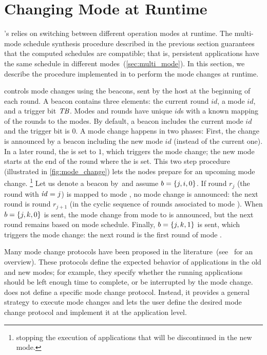 
\section{Changing Mode at Runtime}
\label{sec:modeChanges}

\TTW's  relies on switching between different operation modes at runtime. The multi-mode schedule synthesis procedure described in the previous section guarantees that the computed schedules are compatible; that is, persistent applications have the same schedule in different modes~(\cref{sec:multi_mode}).
In this section, we describe the procedure implemented in \TTW to perform the mode changes at runtime.

\TTW controls mode changes using the beacons, sent by the host at the beginning of each round. A beacon contains three elements: the current round $id$, a mode $id$, and a trigger bit $\mathit{TB}$.
Modes and rounds have unique $id$s with a known mapping of the rounds to the modes. By default, a beacon includes the current mode $id$ and the trigger bit is $0$.
%
A mode change happens in two phases:
First, the change is announced by a beacon including the new mode $id$ (instead of the current one).
In a later round, the \TB is set to $1$, which triggers the mode change; the new mode starts at the end of the round where the \TB is set.
This two step procedure (illustrated in \cref{fig:mode_change}) lets the nodes prepare for an upcoming mode change.%
%
\footnote{\Eg stopping the execution of applications that will be discontinued in the new mode.}
%
Let us denote a beacon by~\beacon and assume $b = \{j, i, 0\}$.
If round $r_j$ (the round with $\mathit{id}=j$) is mapped to mode \modei, no mode change is announced:
the next round is round $r_{j+1}$ (in the cyclic sequence of rounds associated to mode ).
When $b = \{j, k, 0\}$ is sent, the mode change from mode \modei to  is announced, but the next round remains based on mode \modei schedule.
Finally, $b = \{j, k, 1\}$ is sent, which triggers the mode change: the next round is the first round of mode .


Many mode change protocols have been proposed in the literature~(see~\cite{chen2018SafeMC} for an overview). These protocols define the expected behavior of applications in the old and new modes; for example, they specify whether the running applications should be left enough time to complete, or be interrupted by the mode change.
\TTW does not define a specific mode change protocol. Instead, it provides a general strategy to execute mode changes and lets the user define the desired mode change protocol and implement it at the application level.

